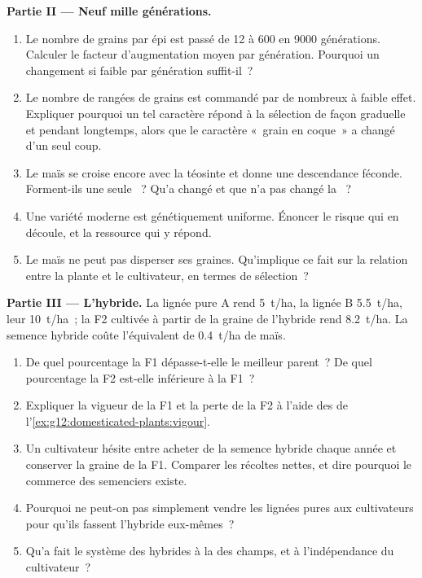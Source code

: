 \begin{problem}
\medskip
\noindent\textbf{Partie II --- Neuf mille générations.}
\begin{enumerate}[resume]
  \item Le nombre de grains par épi est passé de 12 à 600 en 9000
        générations. Calculer le facteur d'augmentation moyen par
        génération. Pourquoi un changement si faible par génération
        suffit-il~?
  \item Le nombre de rangées de grains est commandé par de nombreux
         à faible effet. Expliquer pourquoi un tel caractère
        répond à la sélection de façon graduelle et pendant longtemps,
        alors que le caractère «~grain en coque~» a changé d'un seul
        coup.
  \item Le maïs se croise encore avec la téosinte et donne une
        descendance féconde. Forment-ils une seule ~? Qu'a
        changé et que n'a pas changé la ~?
  \item Une variété moderne est génétiquement uniforme. Énoncer le
        risque qui en découle, et la ressource qui y répond.
  \item Le maïs ne peut pas disperser ses graines. Qu'implique ce fait
        sur la relation entre la plante et le cultivateur, en termes
        de sélection~?
\end{enumerate}

\medskip
\noindent\textbf{Partie III --- L'hybride.}
La lignée pure A rend \qty{5}{t/ha}, la lignée B \qty{5.5}{t/ha}, leur
 \qty{10}{t/ha}~; la F2 cultivée à partir de la graine de
l'hybride rend \qty{8.2}{t/ha}. La semence hybride coûte l'équivalent
de \qty{0.4}{t/ha} de maïs.
\begin{enumerate}[resume]
  \item De quel pourcentage la F1 dépasse-t-elle le meilleur parent~?
        De quel pourcentage la F2 est-elle inférieure à la F1~?
  \item Expliquer la vigueur de la F1 et la perte de la F2 à l'aide
        des  de l'\cref{ex:g12:domesticated-plants:vigour}.
  \item Un cultivateur hésite entre acheter de la semence hybride
        chaque année et conserver la graine de la F1. Comparer les
        récoltes nettes, et dire pourquoi le commerce des semenciers
        existe.
  \item Pourquoi ne peut-on pas simplement vendre les lignées pures
        aux cultivateurs pour qu'ils fassent l'hybride eux-mêmes~?
  \item Qu'a fait le système des hybrides à la  des
        champs, et à l'indépendance du cultivateur~?
\end{enumerate}


\end{problem}
